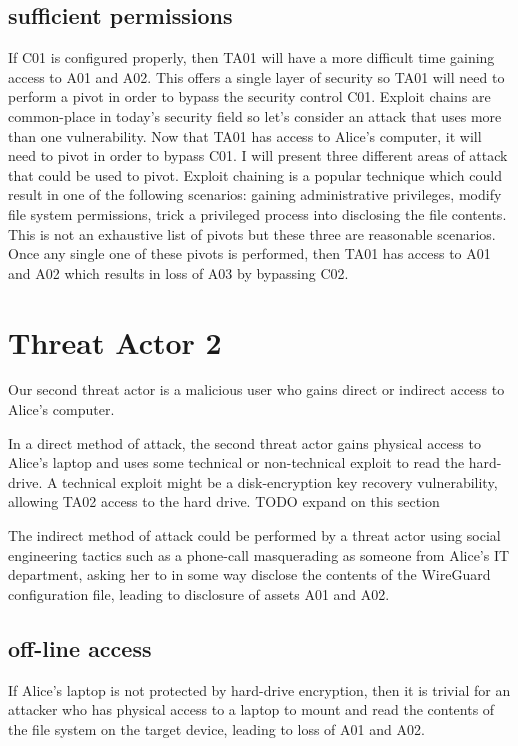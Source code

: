 \documentclass [11pt, proquest] {uwthesis}[2020/02/24]
\begin{document}
\subsection{sufficient permissions}
If C01 is configured properly, then TA01 will have a more difficult time gaining access to A01 and A02. This offers a single layer of security so TA01 will need to perform a pivot in order to bypass the security control C01. Exploit chains are common-place in today's security field so let's consider an attack that uses more than one vulnerability. Now that TA01 has access to Alice's computer, it will need to pivot in order to bypass C01. I will present three different areas of attack that could be used to pivot. Exploit chaining is a popular technique which could result in one of the following scenarios: gaining administrative privileges, modify file system permissions, trick a privileged process into disclosing the file contents. This is not an exhaustive list of pivots but these three are reasonable scenarios. Once any single one of these pivots is performed, then TA01 has access to A01 and A02 which results in loss of A03 by bypassing C02.

\section{Threat Actor 2}
Our second threat actor is a malicious user who gains direct or indirect access to Alice's computer. 

In a direct method of attack, the second threat actor gains physical access to Alice's laptop and uses some technical or non-technical exploit to read the hard-drive. A technical exploit might be a disk-encryption key recovery vulnerability, allowing TA02 access to the hard drive. TODO expand on this section

The indirect method of attack could be performed by a threat actor using social engineering tactics such as a phone-call masquerading as someone from Alice's IT department, asking her to in some way disclose the contents of the WireGuard configuration file, leading to disclosure of assets A01 and A02.


\subsection{off-line access}
If Alice's laptop is not protected by hard-drive encryption, then it is trivial for an attacker who has physical access to a laptop to mount and read the contents of the file system on the target device, leading to loss of A01 and A02.
\end{document}
